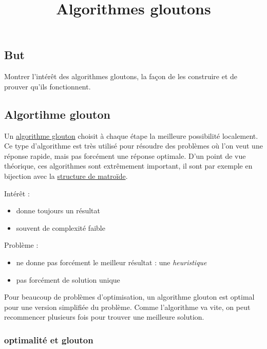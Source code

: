 \documentclass[
]{article}
\title{Algorithmes gloutons}
\author{}
\date{}
\providecommand{\tightlist}{%
  \setlength{\itemsep}{0pt}\setlength{\parskip}{0pt}}
\begin{document}
\maketitle

\hypertarget{but}{%
\subsection{But}\label{but}}

Montrer l'intérêt des algorithmes gloutons, la façon de les construire
et de prouver qu'ils fonctionnent.

\hypertarget{algortihme-glouton}{%
\subsection{Algortihme glouton}\label{algortihme-glouton}}

Un \href{https://fr.wikipedia.org/wiki/Algorithme_glouton}{algorithme
glouton} choisit à chaque étape la meilleure possibilité localement. Ce
type d'algorithme est très utilisé pour résoudre des problèmes où l'on
veut une réponse rapide, mais pas forcément une réponse optimale. D'un
point de vue théorique, ces algorithmes sont extrêmement important, il
sont par exemple en bijection avec la
\href{https://fr.wikipedia.org/wiki/Matro\%C3\%AFde}{structure de
matroïde}.

Intérêt :

\begin{itemize}
\tightlist
\item
  donne toujours un résultat
\item
  souvent de complexité faible
\end{itemize}

Problème :

\begin{itemize}
\tightlist
\item
  ne donne pas forcément le meilleur résultat : une \emph{heuristique}
\item
  pas forcément de solution unique
\end{itemize}

Pour beaucoup de problèmes d'optimisation, un algorithme glouton est
optimal pour une version simplifiée du problème. Comme l'algorithme va
vite, on peut recommencer plusieurs fois pour trouver une meilleure
solution.

\hypertarget{optimalituxe9-et-glouton}{%
\subsubsection{optimalité et glouton}\label{optimalituxe9-et-glouton}}
\end{document}
